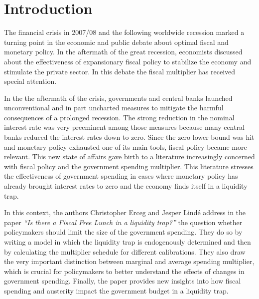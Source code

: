 \section{Introduction}

The financial crisis in 2007/08 and the following worldwide recession marked a turning point in the economic and public debate about optimal fiscal and monetary policy. In the aftermath of the great recession, economists discussed about the effectiveness of expansionary fiscal policy to stabilize the economy and stimulate the private sector. In this debate the fiscal multiplier has received special attention.

In the the aftermath of the crisis, governments and central banks launched unconventional and in part uncharted measures to mitigate the harmful consequences of a prolonged recession. The strong reduction in the nominal interest rate was very preeminent among those measures because many central banks reduced the interest rates down to zero. Since the zero lower bound was hit and monetary policy exhausted one of its main tools, fiscal policy became more relevant. This new state of affairs gave birth to a literature increasingly concerned with fiscal policy and the government spending multiplier. This literature stresses the effectiveness of government spending in cases where monetary policy has already brought interest rates to zero and the economy finds itself in a liquidity trap.
\par
\bigskip
In this context, the authors Christopher Erceg and Jesper Lindé address in the paper \textit{``Is there a Fiscal Free Lunch in a liquidity trap?''} the question whether policymakers should limit the size of the government spending. They do so by writing a model in which the liquidity trap is endogenously determined and then  by calculating the multiplier schedule for different calibrations. They also draw the very important distinction between marginal and average spending multiplier, which is crucial for policymakers to better understand the effects of changes in government spending. Finally, the paper provides new insights into how fiscal spending and austerity impact the government budget in a liquidity trap.
\par
\bigskip
